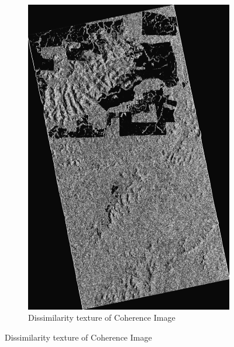 \begin{figure}[H]
\begin{subfigure}[b]{0.4\linewidth}
    \includegraphics[width=\linewidth]{Chapter4/glcm_textures/dissimilarityimage.png}
    \caption{Dissimilarity texture of Coherence Image}
  \end{subfigure}
\end{figure}
\newpage
